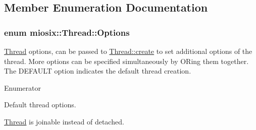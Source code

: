 \subsection{Member Enumeration Documentation}
\hypertarget{classmiosix_1_1_thread_acaef68f0e93f6ad933442d87c210daaf}{
\subsubsection[{Options}]{\setlength{\rightskip}{0pt plus 5cm}enum {\bf miosix\-::\-Thread\-::\-Options}}}\label{classmiosix_1_1_thread_acaef68f0e93f6ad933442d87c210daaf}
\hyperlink{classmiosix_1_1_thread}{Thread} options, can be passed to \hyperlink{classmiosix_1_1_thread_ac5a454f2617a4a28f00842b1097fc363}{Thread\-::create} to set additional options of the thread. More options can be specified simultaneously by O\-Ring them together. The D\-E\-F\-A\-U\-L\-T option indicates the default thread creation. \begin{Desc}
\item[Enumerator]\par
\begin{description}
\item[{\em 
\hypertarget{classmiosix_1_1_thread_acaef68f0e93f6ad933442d87c210daafa03df086cf889e215d75222d10486b71e}{D\-E\-F\-A\-U\-L\-T}\label{classmiosix_1_1_thread_acaef68f0e93f6ad933442d87c210daafa03df086cf889e215d75222d10486b71e}
}]Default thread options. \item[{\em 
\hypertarget{classmiosix_1_1_thread_acaef68f0e93f6ad933442d87c210daafa785d69b0e6b95b648735efe54b588df7}{J\-O\-I\-N\-A\-B\-L\-E}\label{classmiosix_1_1_thread_acaef68f0e93f6ad933442d87c210daafa785d69b0e6b95b648735efe54b588df7}
}]\hyperlink{classmiosix_1_1_thread}{Thread} is joinable instead of detached. \end{description}
\end{Desc}


